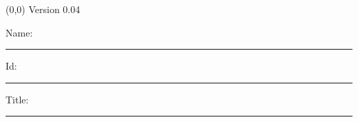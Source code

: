 \documentclass[a4paper]{article}
\newcommand{\mycard}{%
	\small Version 0.04\\
	\vspace{-0.6cm}
	\parbox[t][27.3cm][t]{17.8cm}{%
	\normalsize Name: \rule{2.5cm}{0.01cm} Id: \rule{2.0cm}{0.01cm} Title: \rule{9.0cm}{0.01cm}
	}
}
\begin{document}
\selectfont

\begin{textblock}{14.5}(0,0)
\mycard
\end{textblock}
\end{document}

